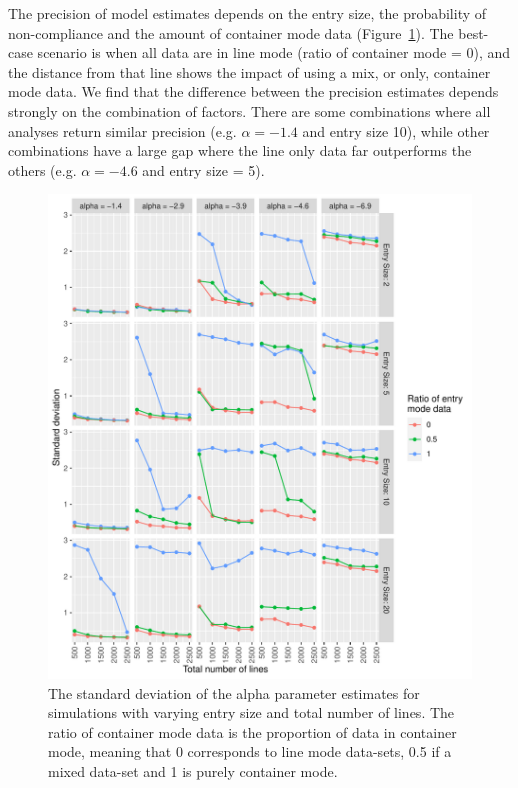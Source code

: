 \documentclass[useAMS,usenatbib,referee]{biom}
\begin{document}
The precision of model estimates depends on the entry size, the probability of non-compliance and the amount of container mode data (Figure~\ref{fig:SD_est_simulated}). The best-case scenario is when all data are in line mode (ratio of container mode = 0), and the distance from that line shows the impact of using a mix, or only, container mode data. We find that the difference between the precision estimates depends strongly on the combination of factors. There are some combinations where all analyses return similar precision (e.g. \(\alpha=-1.4\) and entry size 10), while other combinations have a large gap where the line only data far outperforms the others (e.g. \(\alpha=-4.6\) and entry size = 5).


\begin{figure}[h!]
\includegraphics[width=\textwidth]{sim_study_pint_vs_data_vs_entry_size.pdf}
\caption{The standard deviation of the alpha parameter estimates for simulations with varying entry size and total number of lines. The ratio of container mode data is the proportion of data in container mode, meaning that 0 corresponds to line mode data-sets, 0.5 if a mixed data-set and 1 is purely container mode. }
\label{fig:SD_est_simulated}
\end{figure}
\end{document}
